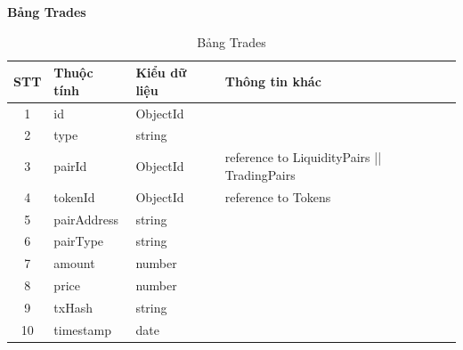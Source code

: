 \clearpage
\hspace{-1cm}\textbf{Bảng Trades}
\begin{table}[H]
    \centering
    \begin{tabular}{|c|l|l|l|}
        \hline
        STT & Thuộc tính  & Kiểu dữ liệu & Thông tin khác                              \\
        \hline
        1   & id          & ObjectId     &                                             \\
        \hline
        2   & type        & string       &                                             \\
        \hline
        3   & pairId      & ObjectId     & reference to LiquidityPairs || TradingPairs \\
        \hline
        4   & tokenId     & ObjectId     & reference to Tokens                         \\
        \hline
        5   & pairAddress & string       &                                             \\
        \hline
        6   & pairType    & string       &                                             \\
        \hline
        7   & amount      & number       &                                             \\
        \hline
        8   & price       & number       &                                             \\
        \hline
        9   & txHash      & string       &                                             \\
        \hline
        10  & timestamp   & date         &                                             \\
        \hline
    \end{tabular}
    \caption{Bảng Trades}
    \label{tab:trades}
\end{table}

